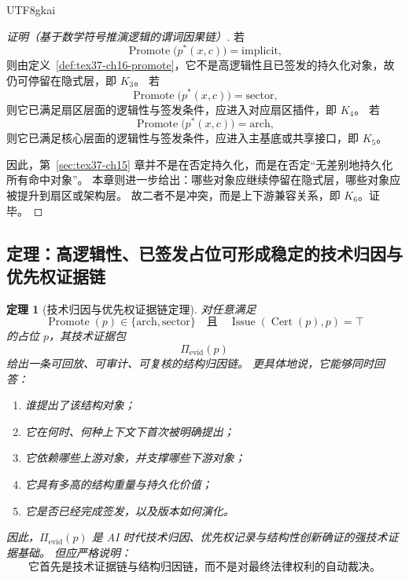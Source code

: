 \documentclass[12pt]{article}
\newtheorem{theorem}{定理}[section]
\newcommand{\Cert}{\operatorname{Cert}}
\newcommand{\Issue}{\operatorname{Issue}}
\newcommand{\Promote}{\operatorname{Promote}}
\begin{document}
\begin{CJK*}{UTF8}{gkai}
\begin{proof}[证明（基于数学符号推演逻辑的谓词因果链）]
若
\[
  \Promote\bigl(p^\ast(x,c)\bigr)=\mathrm{implicit},
\]
则由定义~\ref{def:tex37-ch16-promote}，它不是高逻辑性且已签发的持久化对象，故仍可停留在隐式层，即 $K_3$。
若
\[
  \Promote\bigl(p^\ast(x,c)\bigr)=\mathrm{sector},
\]
则它已满足扇区层面的逻辑性与签发条件，应进入对应扇区插件，即 $K_4$。
若
\[
  \Promote\bigl(p^\ast(x,c)\bigr)=\mathrm{arch},
\]
则它已满足核心层面的逻辑性与签发条件，应进入主基底或共享接口，即 $K_5$。

因此，第~\ref{sec:tex37-ch15} 章并不是在否定持久化，而是在否定“无差别地持久化所有命中对象”。
本章则进一步给出：哪些对象应继续停留在隐式层，哪些对象应被提升到扇区或架构层。
故二者不是冲突，而是上下游兼容关系，即 $K_6$。证毕。
\end{proof}

\subsection{定理：高逻辑性、已签发占位可形成稳定的技术归因与优先权证据链}
\label{subsec:tex37-ch16-theorem-attribution}

\begin{theorem}[技术归因与优先权证据链定理]
\label{thm:tex37-ch16-attribution}
对任意满足
\[
  \Promote(p)\in\{\mathrm{arch},\mathrm{sector}\}
  \quad\text{且}\quad
  \Issue(\Cert(p),p)=\top
\]
的占位 $p$，其技术证据包
\[
  \Pi_{\mathrm{evid}}(p)
\]
给出一条可回放、可审计、可复核的结构归因链。
更具体地说，它能够同时回答：
\begin{enumerate}
  \item 谁提出了该结构对象；
  \item 它在何时、何种上下文下首次被明确提出；
  \item 它依赖哪些上游对象，并支撑哪些下游对象；
  \item 它具有多高的结构重量与持久化价值；
  \item 它是否已经完成签发，以及版本如何演化。
\end{enumerate}
因此，$\Pi_{\mathrm{evid}}(p)$ 是 AI 时代技术归因、优先权记录与结构性创新确证的强技术证据基础。
但应严格说明：
\[
  \boxed{
    \text{它首先是技术证据链与结构归因链，而不是对最终法律权利的自动裁决。}
  }
\]
\end{theorem}


\end{CJK*}
\end{document}
